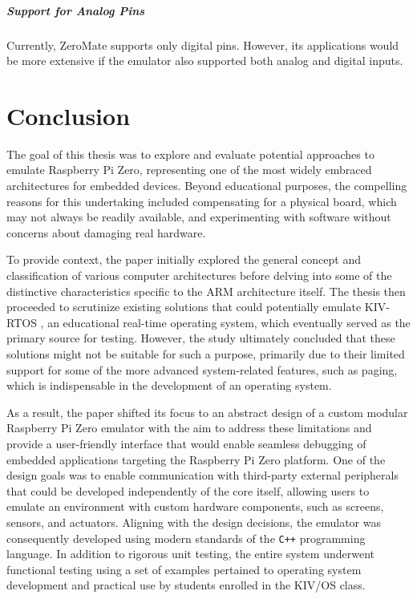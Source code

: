 \documentclass[english, ing, kiv, he, iso690numb, pdf]{fasthesis}
\begin{document}
	\paragraph{Support for Analog Pins}
	
	Currently, ZeroMate supports only digital pins. However, its applications would be more extensive if the emulator also supported both analog and digital inputs.
	
	\chapter{Conclusion}
	
	The goal of this thesis was to explore and evaluate potential approaches to emulate Raspberry Pi Zero, representing one of the most widely embraced architectures for embedded devices. Beyond educational purposes, the compelling reasons for this undertaking included compensating for a physical board, which may not always be readily available, and experimenting with software without concerns about damaging real hardware.
	
	To provide context, the paper initially explored the general concept and classification of various computer architectures before delving into some of the distinctive characteristics specific to the ARM architecture itself. The thesis then proceeded to scrutinize existing solutions that could potentially emulate KIV-RTOS \cite{KIV-RTOS}, an educational real-time operating system, which eventually served as the primary source for testing. However, the study ultimately concluded that these solutions might not be suitable for such a purpose, primarily due to their limited support for some of the more advanced system-related features, such as paging, which is indispensable in the development of an operating system.
	
	As a result, the paper shifted its focus to an abstract design of a custom modular Raspberry Pi Zero emulator with the aim to address these limitations and provide a user-friendly interface that would enable seamless debugging of embedded applications targeting the Raspberry Pi Zero platform. One of the design goals was to enable communication with third-party external peripherals that could be developed independently of the core itself, allowing users to emulate an environment with custom hardware components, such as screens, sensors, and actuators. Aligning with the design decisions, the emulator was consequently developed using modern standards of the  \texttt{C++} programming language. In addition to rigorous unit testing, the entire system underwent functional testing using a set of examples pertained to operating system development and practical use by students enrolled in the KIV/OS class.
	
\end{document}
